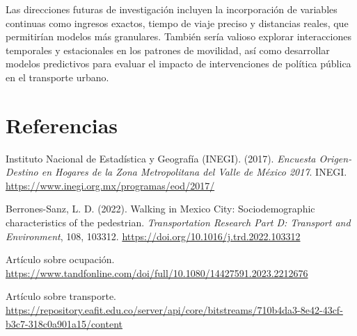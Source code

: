 \documentclass[12pt,a4paper]{article}
\begin{document}
Las direcciones futuras de investigación incluyen la incorporación de variables continuas como ingresos exactos, tiempo de viaje preciso y distancias reales, que permitirían modelos más granulares. También sería valioso explorar interacciones temporales y estacionales en los patrones de movilidad, así como desarrollar modelos predictivos para evaluar el impacto de intervenciones de política pública en el transporte urbano.

\section*{Referencias}

\begin{thebibliography}{99}

 Instituto Nacional de Estadística y Geografía (INEGI). (2017). \textit{Encuesta Origen-Destino en Hogares de la Zona Metropolitana del Valle de México 2017}. INEGI. \url{https://www.inegi.org.mx/programas/eod/2017/}

 Berrones-Sanz, L. D. (2022). Walking in Mexico City: Sociodemographic characteristics of the pedestrian. \textit{Transportation Research Part D: Transport and Environment}, 108, 103312. \url{https://doi.org/10.1016/j.trd.2022.103312}

 Artículo sobre ocupación. \url{https://www.tandfonline.com/doi/full/10.1080/14427591.2023.2212676}

 Artículo sobre transporte. \url{https://repository.eafit.edu.co/server/api/core/bitstreams/710b4da3-8e42-43cf-b3c7-318c0a901a15/content}

\end{thebibliography}
\end{document}
